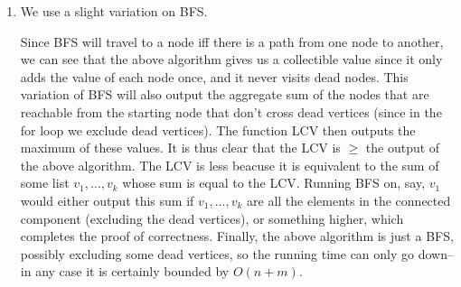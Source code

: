 \documentclass[12pt]{article}
\theoremstyle{definitionstyle}
\begin{document}
\begin{enumerate}[leftmargin=\labelsep]
        \newpage
        \item We use a slight variation on BFS. 
        
        \begin{algorithm}[H]
            \SetAlgoLined



        \end{algorithm}

        Since BFS will travel to a node iff there is a path from one node to another, we can see that the above algorithm gives us a collectible value since it only adds the value of each node once, and it never visits dead nodes. This variation of BFS will also output the aggregate sum of the nodes that are reachable from the starting node that don't cross dead vertices (since in the for loop we exclude dead vertices). The function LCV then outputs the maximum of these values. It is thus clear that the LCV is $\geq$ the output of the above algorithm. The LCV is less beacuse it is equivalent to the sum of some list $v_1, \ldots, v_k$ whose sum is equal to the LCV. Running BFS on, say, $v_1$ would either output this sum if $v_1, \ldots, v_k$ are all the elements in the connected component (excluding the dead vertices), or something higher, which completes the proof of correctness. Finally, the above algorithm is just a BFS, possibly excluding some dead vertices, so the running time can only go down--in any case it is certainly bounded by $O(n+m)$.


\end{enumerate}
\end{document}
